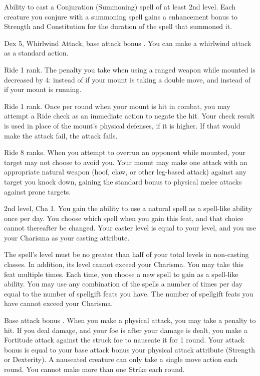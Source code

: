  Ability to cast a Conjuration (Summoning) spell of at least 2nd level.
 Each creature you conjure with a summoning spell gains a  enhancement bonus to Strength and Constitution for the duration of the spell that summoned it.

\featpres Dex 5, Whirlwind Attack, base attack bonus .
\featben You can make a whirlwind attack as a standard action.

\featpre Ride 1 rank.
 The penalty you take when using a ranged weapon while mounted is decreased by 4:  instead of  if your mount is taking a double move, and  instead of  if your mount is running.

 Ride 1 rank.
 Once per round when your mount is hit in combat, you may attempt a Ride check as an immediate action to negate the hit. Your check result is used in place of the mount's physical defenses, if it is higher. If that would make the attack fail, the attack fails.

 Ride 8 ranks.
 When you attempt to overrun an opponent while mounted, your target may not choose to avoid you. Your mount may make one attack with an appropriate natural weapon (hoof, claw, or other leg-based attack) against any target you knock down, gaining the standard  bonus to physical melee attacks against prone targets.

\featpre 2nd level, Cha 1.
\featben You gain the ability to use a natural spell as a spell-like ability once per day. You choose which spell when you gain this feat, and that choice cannot thereafter be changed. Your caster level is equal to your level, and you use your Charisma as your casting attribute.

The spell's level must be no greater than half of your total levels in non-casting classes. In addition, its level cannot exceed your Charisma.
 You may take this feat multiple times. Each time, you choose a new spell to gain as a spell-like ability. You may use any combination of the spells a number of times per day equal to the number of spellgift feats you have. The number of spellgift feats you have cannot exceed your Charisma.

\featpre Base attack bonus .
\featben When you make a physical attack, you may take a  penalty to hit. If you deal damage, and your foe is \bloodied after your damage is dealt, you make a Fortitude attack against the struck foe to nauseate it for 1 round. Your attack bonus is equal to your base attack bonus \add your physical attack attribute (Strength or Dexterity). A nauseated creature can only take a single move action each round. You cannot make more than one Strike each round.

